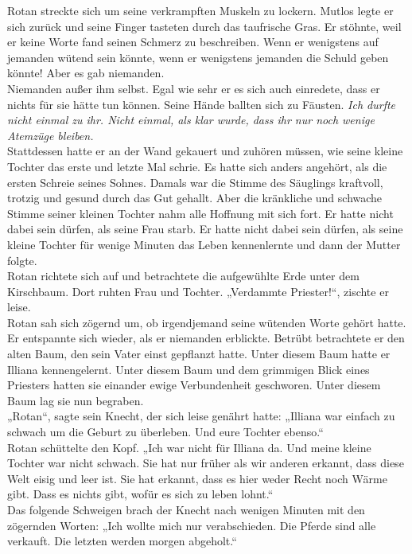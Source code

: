 Rotan streckte sich um seine verkrampften Muskeln zu lockern. Mutlos legte er sich zurück und seine 
Finger tasteten durch das taufrische Gras. Er stöhnte, weil er keine Worte fand seinen Schmerz zu 
beschreiben. Wenn er wenigstens auf jemanden wütend sein könnte, wenn er wenigstens jemanden die 
Schuld geben könnte! Aber es gab niemanden.\\
Niemanden außer ihm selbst. Egal wie sehr er es sich auch einredete, dass er nichts für sie hätte 
tun können. Seine Hände ballten sich zu Fäusten. \textit{Ich durfte nicht einmal zu ihr. Nicht 
einmal, als klar wurde, dass ihr nur noch wenige Atemzüge bleiben.}\\
Stattdessen hatte er an der Wand gekauert und zuhören müssen, wie seine kleine Tochter das erste 
und letzte Mal schrie. Es hatte sich anders angehört, als die ersten Schreie seines Sohnes. Damals 
war die Stimme des Säuglings kraftvoll, trotzig und gesund durch das Gut gehallt. Aber die 
kränkliche und schwache Stimme seiner kleinen Tochter nahm alle Hoffnung mit sich fort. Er hatte 
nicht dabei sein dürfen, als seine Frau starb. Er hatte nicht dabei sein dürfen, als seine kleine 
Tochter für wenige Minuten das Leben kennenlernte und dann der Mutter folgte.\\
Rotan richtete sich auf und betrachtete die aufgewühlte Erde unter dem Kirschbaum. Dort ruhten Frau 
und Tochter. „Verdammte Priester!“, zischte er leise.\\
Rotan sah sich zögernd um, ob irgendjemand seine wütenden Worte gehört hatte. Er entspannte sich 
wieder, als er niemanden erblickte. Betrübt betrachtete er den alten Baum, den sein Vater einst 
gepflanzt hatte. Unter diesem Baum hatte er Illiana kennengelernt. Unter diesem Baum und dem 
grimmigen Blick eines Priesters hatten sie einander ewige Verbundenheit geschworen. Unter diesem 
Baum lag sie nun begraben.\\
„Rotan“, sagte sein Knecht, der sich leise genährt hatte: „Illiana war einfach zu schwach um die 
Geburt zu überleben. Und eure Tochter ebenso.“\\
Rotan schüttelte den Kopf. „Ich war nicht für Illiana da. Und meine kleine Tochter war nicht 
schwach. Sie hat nur früher als wir anderen erkannt, dass diese Welt eisig und leer ist. Sie hat 
erkannt, dass es hier weder Recht noch Wärme gibt. Dass es nichts gibt, wofür es sich zu leben 
lohnt.“\\
Das folgende Schweigen brach der Knecht nach wenigen Minuten mit den zögernden Worten: „Ich wollte 
mich nur verabschieden. Die Pferde sind alle verkauft. Die letzten werden morgen abgeholt.“\\
